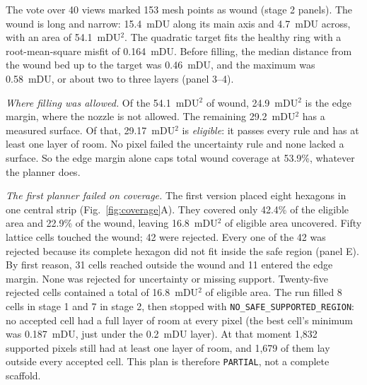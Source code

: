 \documentclass[conference]{IEEEtran}
\begin{document}
The vote over 40 views marked 153 mesh points as wound (stage 2 panels). The
wound is long and narrow: 15.4~mDU along its main axis and 4.7~mDU across,
with an area of 54.1~mDU$^2$. The quadratic target fits the healthy ring
with a root-mean-square misfit of 0.164~mDU. Before filling, the median
distance from the wound bed up to the target was 0.46~mDU, and the maximum
was 0.58~mDU, or about two to three layers (panel 3--4).

\emph{Where filling was allowed.} Of the 54.1~mDU$^2$ of wound, 24.9~mDU$^2$
is the edge margin, where the nozzle is not allowed. The remaining
29.2~mDU$^2$ has a measured surface. Of that, 29.17~mDU$^2$ is
\emph{eligible}: it passes every rule and has at least one layer of room.
No pixel failed the uncertainty rule and none lacked a surface. So the edge
margin alone caps total wound coverage at 53.9\%, whatever the planner does.

\emph{The first planner failed on coverage.} The first version placed eight
hexagons in one central strip (Fig.~\ref{fig:coverage}A). They covered only
42.4\% of the eligible area and 22.9\% of the wound, leaving 16.8~mDU$^2$ of
eligible area uncovered. Fifty lattice cells touched the wound; 42 were
rejected. Every one of the 42 was rejected because its complete hexagon did
not fit inside the safe region (panel E). By first reason, 31 cells reached
outside the wound and 11 entered the edge margin. None was rejected for
uncertainty or missing support. Twenty-five rejected cells contained a total
of 16.8~mDU$^2$ of eligible area. The run filled 8 cells in stage 1 and 7 in
stage 2, then stopped with \texttt{NO\_SAFE\_SUPPORTED\_REGION}: no accepted
cell had a full layer of room at every pixel (the best cell's minimum was
0.187~mDU, just under the 0.2~mDU layer). At that moment 1{,}832 supported
pixels still had at least one layer of room, and 1{,}679 of them lay outside
every accepted cell.
This plan is therefore \texttt{PARTIAL}, not a complete scaffold.
\end{document}
